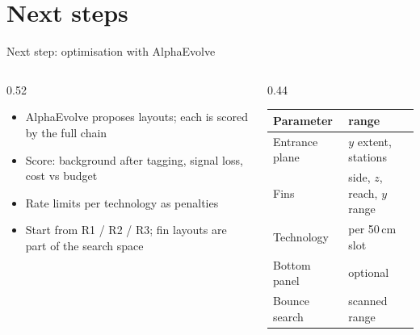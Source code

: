 \documentclass[aspectratio=149,11pt]{beamer}
\begin{document}
\section{Next steps}
\begin{frame}{Next step: optimisation with AlphaEvolve}
  \begin{columns}[T]
    \begin{column}{0.52\textwidth}
      \small
      \begin{itemize}\setlength{\itemsep}{3pt}
        \item AlphaEvolve proposes layouts; each is scored by the full chain
        \item Score: background after tagging, signal loss, cost vs budget
        \item Rate limits per technology as penalties
        \item Start from R1 / R2 / R3; fin layouts are part of the search space
      \end{itemize}
    \end{column}
    \begin{column}{0.44\textwidth}
      \footnotesize
      \begin{tabular}{@{}ll@{}}
        \toprule
        Parameter & range \\
        \midrule
        Entrance plane & $y$ extent, stations \\
        Fins & side, $z$, reach, $y$ range \\
        Technology & per 50\,cm slot \\
        Bottom panel & optional \\
        Bounce search & scanned range \\
        \bottomrule
      \end{tabular}
    \end{column}
  \end{columns}
\end{frame}
\end{document}

